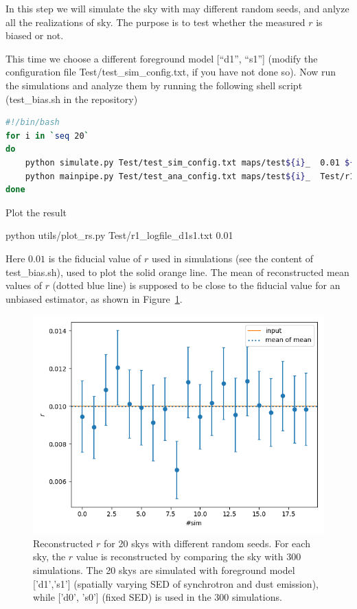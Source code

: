 \documentclass[12pt, a4paper]{ctexart} %
\def\tbox#1{\begin{tcolorbox}#1\end{tcolorbox}}
\begin{document}
In this step we will simulate the sky with may different random seeds, and anlyze all the realizations of sky. The purpose is to test whether the measured $r$ is biased or not.

This time we choose a different foreground model [``d1'', ``s1''] (modify the configuration file Test/test\_sim\_config.txt, if you have not done so). Now run the simulations and analyze them by running the following shell script (test\_bias.sh in the repository)


\begin{lstlisting}[language=bash, caption={Testing $r$ bias}]
#!/bin/bash
for i in `seq 20` 
do 
    python simulate.py Test/test_sim_config.txt maps/test${i}_  0.01 ${i}  d1s1  
    python mainpipe.py Test/test_ana_config.txt maps/test${i}_  Test/r1_logfile_d1s1.txt
done
\end{lstlisting}



Plot the result
\tbox{python utils/plot\_rs.py Test/r1\_logfile\_d1s1.txt 0.01}

Here $0.01$ is the fiducial value of $r$ used in simulations (see the content of test\_bias.sh), used to plot the solid orange line. The mean of reconstructed mean values of $r$ (dotted blue line) is supposed to be close to the fiducial value for an unbiased estimator, as shown in Figure~\ref{fig:r_logs}.

\begin{figure}
  \includegraphics[width=\textwidth]{r_logs.png}
  \caption{Reconstructed $r$ for 20 skys with different random seeds. For each sky, the $r$ value is reconstructed by comparing the sky with 300 simulations. The 20 skys are simulated with foreground model ['d1','s1'] (spatially varying SED of synchrotron and dust emission), while  ['d0', 's0'] (fixed SED) is used in the 300 simulations. \label{fig:r_logs}}
\end{figure}
\end{document}
